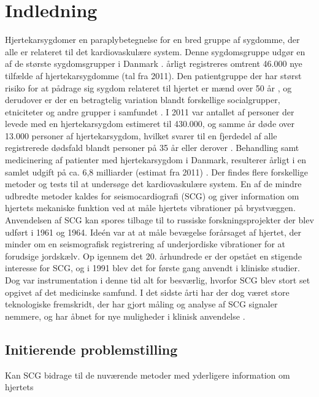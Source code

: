 \chapter{Indledning} \label{Indledning}

\textquotedbl Hjertekarsygdom\textquotedbl er en paraplybetegnelse for en bred gruppe af sygdomme, der alle er relateret til det kardiovaskulære system. Denne sygdomsgruppe udgør en af de største sygdomsgrupper i Danmark \cite{livet}. årligt registreres omtrent 46.000 nye tilfælde af hjertekarsygdomme (tal fra 2011). Den patientgruppe der har størst risiko for at pådrage sig sygdom relateret til hjertet er mænd over 50 år \cite{2011}, og derudover er der en betragtelig variation blandt forskellige socialgrupper, etniciteter og andre grupper i samfundet \cite{hjerteforening}. I 2011 var antallet af personer der levede med en hjertekarsygdom estimeret til 430.000, og samme år døde over 13.000 personer af hjertekarsygdom, hvilket svarer til en fjerdedel af alle registrerede dødsfald blandt personer på 35 år eller derover \cite{2011}. Behandling samt medicinering af patienter med hjertekarsygdom i Danmark, resulterer årligt i en samlet udgift på ca. 6,8 milliarder (estimat fra 2011) \cite{hjerteforening}. Der findes flere forskellige metoder og tests til at undersøge det kardiovaskulære system. En af de mindre udbredte metoder kaldes for seismocardiografi (SCG) og giver information om hjertets mekaniske funktion ved at måle hjertets vibrationer på brystvæggen. Anvendelsen af SCG kan spores tilbage til to russiske forskningsprojekter der blev udført  i 1961 og 1964. Ideén var at at måle bevægelse forårsaget af hjertet, der minder om en seismografisk registrering af underjordiske vibrationer for at forudsige jordskælv. Op igennem det 20. århundrede er der opstået en stigende interesse for SCG, og i 1991 blev det for første gang anvendt i kliniske studier. Dog var instrumentation i denne tid alt for besværlig, hvorfor SCG blev stort set opgivet af det medicinske samfund. I det sidste årti har der dog været store teknologiske fremskridt, der har gjort måling og analyse af SCG signaler nemmere, og har åbnet for nye muligheder i klinisk anvendelse \cite{onan} \cite{zanetti}.

\section{Initierende problemstilling} Kan SCG bidrage til de nuværende metoder med yderligere information om hjertets